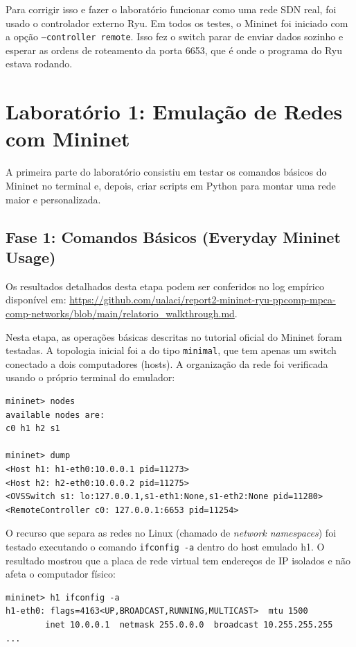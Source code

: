 \documentclass[12pt,a4paper]{article}
\begin{document}
Para corrigir isso e fazer o laboratório funcionar como uma rede SDN real, foi usado o controlador externo Ryu. Em todos os testes, o Mininet foi iniciado com a opção \texttt{--controller remote}. Isso fez o switch parar de enviar dados sozinho e esperar as ordens de roteamento da porta 6653, que é onde o programa do Ryu estava rodando.

\section{Laboratório 1: Emulação de Redes com Mininet}

A primeira parte do laboratório consistiu em testar os comandos básicos do Mininet no terminal e, depois, criar scripts em Python para montar uma rede maior e personalizada.

\subsection{Fase 1: Comandos Básicos (Everyday Mininet Usage)}

Os resultados detalhados desta etapa podem ser conferidos no log empírico disponível em: \url{https://github.com/ualaci/report2-mininet-ryu-ppcomp-mpca-comp-networks/blob/main/relatorio_walkthrough.md}.

Nesta etapa, as operações básicas descritas no tutorial oficial do Mininet foram testadas.
A topologia inicial foi a do tipo \texttt{minimal}, que tem apenas um switch conectado a dois computadores (hosts). A organização da rede foi verificada usando o próprio terminal do emulador:

\begin{lstlisting}
mininet> nodes
available nodes are: 
c0 h1 h2 s1

mininet> dump
<Host h1: h1-eth0:10.0.0.1 pid=11273> 
<Host h2: h2-eth0:10.0.0.2 pid=11275> 
<OVSSwitch s1: lo:127.0.0.1,s1-eth1:None,s1-eth2:None pid=11280> 
<RemoteController c0: 127.0.0.1:6653 pid=11254> 
\end{lstlisting}

O recurso que separa as redes no Linux (chamado de \textit{network namespaces}) foi testado executando o comando \texttt{ifconfig -a} dentro do host emulado h1. O resultado mostrou que a placa de rede virtual tem endereços de IP isolados e não afeta o computador físico:

\begin{lstlisting}
mininet> h1 ifconfig -a
h1-eth0: flags=4163<UP,BROADCAST,RUNNING,MULTICAST>  mtu 1500
        inet 10.0.0.1  netmask 255.0.0.0  broadcast 10.255.255.255
...
\end{lstlisting}
\end{document}
